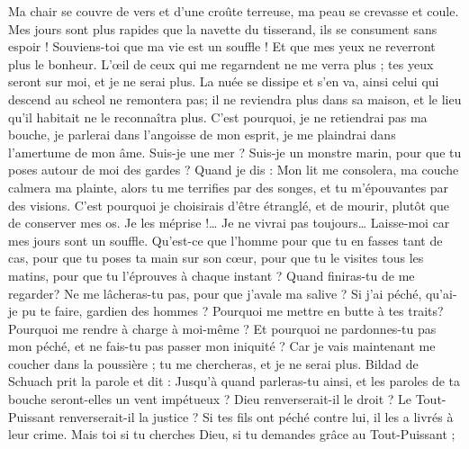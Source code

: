 \begin{multicols}{2}
Ma chair se couvre de vers et d'une croûte terreuse, ma peau se crevasse et coule.
Mes jours sont plus rapides que la navette du tisserand, ils se consument sans espoir !
Souviens-toi que ma vie est un souffle ! Et que mes yeux ne reverront plus le bonheur.
L'œil de ceux qui me regarndent ne me verra plus ; tes yeux seront sur moi, et je ne serai plus.
La nuée se dissipe et s'en va, ainsi celui qui descend au scheol ne remontera pas;
il ne reviendra plus dans sa maison, et le lieu qu'il habitait ne le reconnaîtra plus.
C'est pourquoi, je ne retiendrai pas ma bouche, je parlerai dans l'angoisse de mon esprit, je me plaindrai dans l'amertume de mon âme.
Suis-je une mer ? Suis-je un monstre marin, pour que tu poses autour de moi des gardes ?
Quand je dis : Mon lit me consolera, ma couche calmera ma plainte,
alors tu me terrifies par des songes, et tu m'épouvantes par des visions.
C'est pourquoi je choisirais d'être étranglé, et de mourir, plutôt que de conserver mes os.
Je les méprise !… Je ne vivrai pas toujours… Laisse-moi car mes jours sont un souffle.
Qu'est-ce que l'homme pour que tu en fasses tant de cas, pour que tu poses ta main sur son cœur,
pour que tu le visites tous les matins, pour que tu l'éprouves à chaque instant ?
Quand finiras-tu de me regarder? Ne me lâcheras-tu pas, pour que j'avale ma salive ?
Si j'ai péché, qu'ai-je pu te faire, gardien des hommes ? Pourquoi me mettre en butte à tes traits? Pourquoi me rendre à charge à moi-même ?
Et pourquoi ne pardonnes-tu pas mon péché, et ne fais-tu pas passer mon iniquité ? Car je vais maintenant me coucher dans la poussière ; tu me chercheras, et je ne serai plus.
\VerseOne{}Bildad de Schuach prit la parole et dit :
Jusqu'à quand parleras-tu ainsi, et les paroles de ta bouche seront-elles un vent impétueux ?
Dieu renverserait-il le droit ? Le Tout-Puissant renverserait-il la justice ?
Si tes fils ont péché contre lui, il les a livrés à leur crime.
Mais toi si tu cherches Dieu, si tu demandes grâce au Tout-Puissant ;

\end{multicols}
